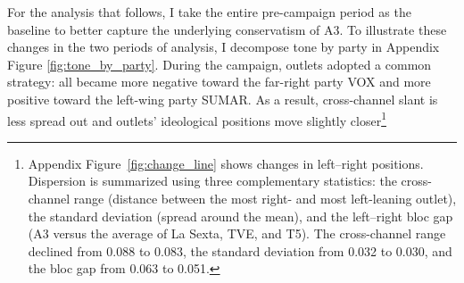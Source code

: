 \documentclass[12pt]{article}
\begin{document}
For the analysis that follows, I take the entire pre-campaign period as the baseline to better capture the underlying conservatism of A3. To illustrate these changes in the two periods of analysis, I decompose tone by party in Appendix Figure \ref{fig:tone_by_party}. During the campaign, outlets adopted a common strategy: all became more negative toward the far-right party VOX and more positive toward the left-wing party SUMAR. As a result, cross-channel slant is less spread out and outlets’ ideological positions move slightly closer\footnote{Appendix Figure~\ref{fig:change_line} shows changes in left–right positions. Dispersion is summarized using three complementary statistics: the cross-channel range (distance between the most right- and most left-leaning outlet), the standard deviation (spread around the mean), and the left–right bloc gap (A3 versus the average of La Sexta, TVE, and T5). The cross-channel range declined from 0.088 to 0.083, the standard deviation from 0.032 to 0.030, and the bloc gap from 0.063 to 0.051.}




\end{document}
